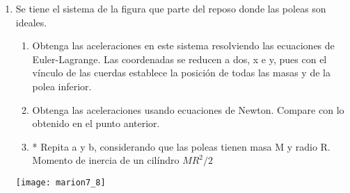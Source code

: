 \documentclass[11pt,spanish,a4paper]{article}
\begin{document}
\begin{enumerate}
\item \begin{minipage}[t][11cm]{0.65\textwidth}
Se tiene el sistema de la figura que parte del reposo donde las poleas son ideales.
  \begin{enumerate}
    \item Obtenga las aceleraciones en este sistema resolviendo las ecuaciones de Euler-Lagrange.
		Las coordenadas se reducen a dos, x e y, pues con el vínculo de las cuerdas establece la posición de todas las masas y de la polea inferior.
	\item Obtenga las aceleraciones usando ecuaciones de Newton.
	Compare con lo obtenido en el punto anterior.
	\item * Repita a y b, considerando que las poleas tienen masa M y radio R.
		Momento de inercia de un cilíndro \(MR^2/2\)
  \end{enumerate}
\end{minipage}
    \begin{minipage}[c][0.5em][t]{0.3\textwidth}
		\texttt{[image: marion7\_8]}
    \end{minipage}




\end{enumerate}
\end{document}
